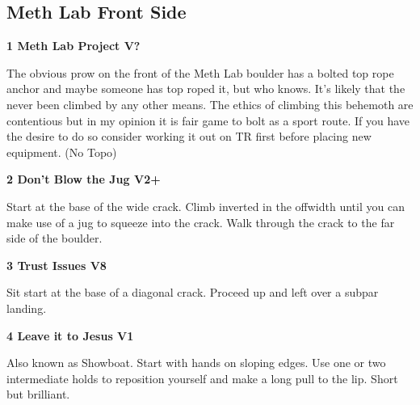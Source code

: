 	\begin{multicols}{2}


\needspace{1.5cm}
\subsection*{Meth Lab Front Side}\label{bf:Meth Lab Front Side}
	


\needspace{1.5cm}
\label{rt:Meth Lab Project}
\colorbox{black!20}{
\parbox{0.95\linewidth}{
\textbf{
1 Meth Lab Project V?  \warn\warn\warn
}}}

\begin{adjustwidth}{0.5cm}{}			
The obvious prow on the front of the Meth Lab boulder has a bolted top rope anchor and maybe someone has top roped it, but who knows. It's likely that the never been climbed by any other means. The ethics of climbing this behemoth are contentious but in my opinion it is fair game to bolt as a sport route. If you have the desire to do so consider working it out on TR first before placing new equipment. (No Topo)
\end{adjustwidth}



\needspace{1.5cm}
\label{rt:Don't Blow the Jug}
\colorbox{green!20}{
\parbox{0.95\linewidth}{
\textbf{
2 Don't Blow the Jug V2+  \warn
}}}

\begin{adjustwidth}{0.5cm}{}			
Start at the base of the wide crack. Climb inverted in the offwidth until you can make use of a jug to squeeze into the crack. Walk through the crack to the far side of the boulder.
\end{adjustwidth}



\needspace{1.5cm}
\label{rt:Trust Issues}
\colorbox{Goldenrod!50}{
\parbox{0.95\linewidth}{
\textbf{
3 Trust Issues V8  \warn\warn
}}}

\begin{adjustwidth}{0.5cm}{}			
Sit start at the base of a diagonal crack. Proceed up and left over a subpar landing.
\end{adjustwidth}



\needspace{1.5cm}
\label{rt:Leave it to Jesus}
\colorbox{green!20}{
\parbox{0.95\linewidth}{
\textbf{
4 Leave it to Jesus V1  
}}}

\begin{adjustwidth}{0.5cm}{}			
Also known as Showboat. Start with hands on sloping edges. Use one or two intermediate holds to reposition yourself and make a long pull to the lip. Short but brilliant.
\end{adjustwidth}


\end{multicols}
